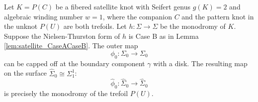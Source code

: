 \begin{prop}\label{prop:capping_trefoil}
    Let $K = P(C)$ be a fibered satellite knot with Seifert genus $g(K) = 2$ and algebraic winding number $w=1$, where the companion $C$ and the pattern knot in the unknot $P(U)$ are both trefoils. Let $h \colon \Sigma \to \Sigma$ be the monodromy of $K$.
    Suppose the Nielsen-Thurston form of $h$ is Case B as in Lemma \ref{lem:satellite_CaseACaseB}. The outer map
    \[
    \phi_0 \colon \Sigma_0 \to \Sigma_0
    \]
    can be capped off at the boundary component $\gamma$ with a disk. The resulting map on the surface $\widehat{\Sigma}_0 \cong \Sigma_1^1$:
    \[
    \widehat{\phi}_0 \colon \widehat{\Sigma}_0 \to \widehat{\Sigma}_0
    \]
    is precisely the monodromy of the trefoil $P(U)$.
\end{prop}


